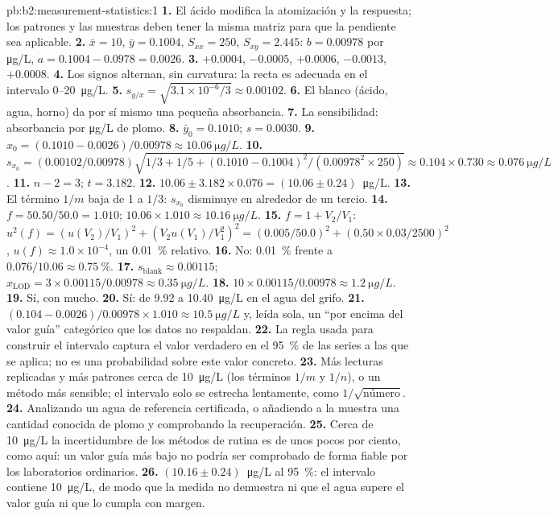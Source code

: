 \begin{solution}{pb:b2:measurement-statistics:1}
\textbf{1.} El ácido modifica la atomización y la respuesta; los patrones y las muestras deben tener la misma
matriz para que la pendiente sea aplicable.
\textbf{2.} $\bar x = 10$, $\bar y = 0.1004$, $S_{xx} = 250$, $S_{xy} = 2.445$: $b = 0.00978$ por
\unit{\micro g/L}, $a = 0.1004 - 0.0978 = 0.0026$.
\textbf{3.} $+0.0004$, $-0.0005$, $+0.0006$, $-0.0013$, $+0.0008$.
\textbf{4.} Los signos alternan, sin curvatura: la recta es adecuada en el intervalo 0--\qty{20}{\micro g/L}.
\textbf{5.} $s_{y/x} = \sqrt{3.1 \times 10^{-6}/3} \approx 0.00102$.
\textbf{6.} El blanco (ácido, agua, horno) da por sí mismo una pequeña absorbancia.
\textbf{7.} La sensibilidad: absorbancia por \unit{\micro g/L} de plomo.
\textbf{8.} $\bar y_0 = 0.1010$; $s = 0.0030$.
\textbf{9.} $x_0 = (0.1010 - 0.0026)/0.00978 \approx \qty{10.06}{\micro g/L}$.
\textbf{10.} $s_{x_0} = (0.00102/0.00978)\sqrt{1/3 + 1/5 + (0.1010 - 0.1004)^2/(0.00978^2 \times 250)}
\approx 0.104 \times 0.730 \approx \qty{0.076}{\micro g/L}$.
\textbf{11.} $n - 2 = 3$; $t = 3.182$.
\textbf{12.} $10.06 \pm 3.182 \times 0.076 = (10.06 \pm 0.24)$~\unit{\micro g/L}.
\textbf{13.} El término $1/m$ baja de 1 a $1/3$: $s_{x_0}$ disminuye en alrededor de un tercio.
\textbf{14.} $f = 50.50/50.0 = 1.010$; $10.06 \times 1.010 \approx \qty{10.16}{\micro g/L}$.
\textbf{15.} $f = 1 + V_2/V_1$: $u^2(f) = (u(V_2)/V_1)^2 + (V_2u(V_1)/V_1^2)^2 = (0.005/50.0)^2 +
(0.50 \times 0.03/2500)^2$, $u(f) \approx 1.0 \times 10^{-4}$, un 0.01~\% relativo.
\textbf{16.} No: 0.01~\% frente a $0.076/10.06 \approx 0.75~\%$.
\textbf{17.} $s_{\mathrm{blank}} \approx 0.00115$; $x_{\mathrm{LOD}} = 3 \times 0.00115/0.00978 \approx
\qty{0.35}{\micro g/L}$.
\textbf{18.} $10 \times 0.00115/0.00978 \approx \qty{1.2}{\micro g/L}$.
\textbf{19.} Sí, con mucho.
\textbf{20.} Sí: de 9.92 a \qty{10.40}{\micro g/L} en el agua del grifo.
\textbf{21.} $(0.104 - 0.0026)/0.00978 \times 1.010 \approx \qty{10.5}{\micro g/L}$ y, leída sola,
un ``por encima del valor guía'' categórico que los datos no respaldan.
\textbf{22.} La regla usada para construir el intervalo captura el valor verdadero en el 95~\% de las series a
las que se aplica; no es una probabilidad sobre este valor concreto.
\textbf{23.} Más lecturas replicadas y más patrones cerca de \qty{10}{\micro g/L} (los términos $1/m$ y
$1/n$), o un método más sensible; el intervalo solo se estrecha lentamente, como $1/\sqrt{\text{número}}$.
\textbf{24.} Analizando un agua de referencia certificada, o añadiendo a la muestra una cantidad conocida de
plomo y comprobando la recuperación.
\textbf{25.} Cerca de \qty{10}{\micro g/L} la incertidumbre de los métodos de rutina es de unos pocos por ciento, como aquí: un
valor guía más bajo no podría ser comprobado de forma fiable por los laboratorios ordinarios.
\textbf{26.} $\boldsymbol{(10.16 \pm 0.24)}$~\unit{\micro g/L} al 95~\%: el intervalo contiene
\qty{10}{\micro g/L}, de modo que la medida no demuestra ni que el agua supere el valor guía ni que lo cumpla
con margen.
\end{solution}
